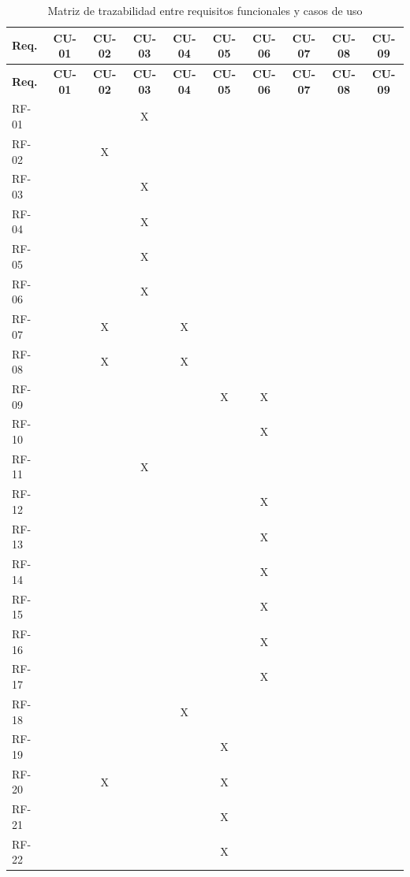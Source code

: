 {\renewcommand{\arraystretch}{1.25}\scriptsize
\setlength{\tabcolsep}{3.2pt}
\begin{longtable}{|p{1.35cm}|c|c|c|c|c|c|c|c|c|}
\caption{Matriz de trazabilidad entre requisitos funcionales y casos de uso}\label{tab:trazabilidad-rf-cu}\\
\hline
\textbf{Req.} & \textbf{CU-01} & \textbf{CU-02} & \textbf{CU-03} & \textbf{CU-04} & \textbf{CU-05} & \textbf{CU-06} & \textbf{CU-07} & \textbf{CU-08} & \textbf{CU-09} \\
\hline
\endfirsthead
\hline
\textbf{Req.} & \textbf{CU-01} & \textbf{CU-02} & \textbf{CU-03} & \textbf{CU-04} & \textbf{CU-05} & \textbf{CU-06} & \textbf{CU-07} & \textbf{CU-08} & \textbf{CU-09} \\
\hline
\endhead
RF-01 &  &  & X &  &  &  &  &  &  \\\hline
RF-02 &  & X &  &  &  &  &  &  &  \\\hline
RF-03 &  &  & X &  &  &  &  &  &  \\\hline
RF-04 &  &  & X &  &  &  &  &  &  \\\hline
RF-05 &  &  & X &  &  &  &  &  &  \\\hline
RF-06 &  &  & X &  &  &  &  &  &  \\\hline
RF-07 &  & X &  & X &  &  &  &  &  \\\hline
RF-08 &  & X &  & X &  &  &  &  &  \\\hline
RF-09 &  &  &  &  & X & X &  &  &  \\\hline
RF-10 &  &  &  &  &  & X &  &  &  \\\hline
RF-11 &  &  & X &  &  &  &  &  &  \\\hline
RF-12 &  &  &  &  &  & X &  &  &  \\\hline
RF-13 &  &  &  &  &  & X &  &  &  \\\hline
RF-14 &  &  &  &  &  & X &  &  &  \\\hline
RF-15 &  &  &  &  &  & X &  &  &  \\\hline
RF-16 &  &  &  &  &  & X &  &  &  \\\hline
RF-17 &  &  &  &  &  & X &  &  &  \\\hline
RF-18 &  &  &  & X &  &  &  &  &  \\\hline
RF-19 &  &  &  &  & X &  &  &  &  \\\hline
RF-20 &  & X &  &  & X &  &  &  &  \\\hline
RF-21 &  &  &  &  & X &  &  &  &  \\\hline
RF-22 &  &  &  &  & X &  &  &  &  \\\hline

\end{longtable}}
